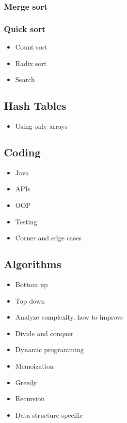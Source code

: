 \documentclass{article}
\begin{document}
\subsubsection{Merge sort}


\subsubsection{Quick sort}

\begin{itemize}
    \item Count sort
    \item Radix sort
    \item Search
\end{itemize}

\subsection{Hash Tables}
\begin{itemize}
    \item Using only arrays
\end{itemize}

\subsection{Coding}
\begin{itemize}
    \item Java
    \item APIs
    \item OOP
    \item Testing
    \item Corner and edge cases
\end{itemize}

\subsection{Algorithms}
\begin{itemize}
    \item Bottom up
    \item Top down
    \item Analyze complexity, how to improve
    \item Divide and conquer
    \item Dynamic programming
    \item Memoization
    \item Greedy
    \item Recursion
    \item Data structure specific
\end{itemize}
\end{document}
